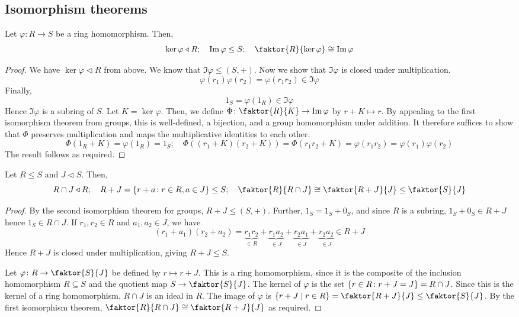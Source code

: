 \subsection{Isomorphism theorems}
\begin{theorem}
	Let \( \varphi \colon R \to S \) be a ring homomorphism.
	Then,
	\[
		\ker \varphi \triangleleft R;\quad \Im \varphi \leq S;\quad \faktor{R}{\ker \varphi} \cong \Im \varphi
	\]
\end{theorem}
\begin{proof}
	We have \( \ker \varphi \triangleleft R \) from above.
	We know that \( \Im \varphi \leq (S, +) \).
	Now we show that \( \Im \varphi \) is closed under multiplication.
	\[
		\varphi(r_1) \varphi(r_2) = \varphi(r_1 r_2) \in \Im \varphi
	\]
	Finally,
	\[
		1_S = \varphi(1_R) \in \Im \varphi
	\]
	Hence \( \Im \varphi \) is a subring of \( S \).
	Let \( K = \ker \varphi \).
	Then, we define \( \Phi \colon \faktor{R}{K} \to \Im \varphi \) by \( r+K \mapsto r \).
	By appealing to the first isomorphism theorem from groups, this is well-defined, a bijection, and a group homomorphism under addition.
	It therefore suffices to show that \( \Phi \) preserves multiplication and maps the multiplicative identities to each other.
	\[
		\Phi(1_R + K) = \varphi(1_R) = 1_S;\quad \Phi((r_1+K)(r_2+K)) = \Phi(r_1 r_2 +K) = \varphi(r_1 r_2) = \varphi(r_1) \varphi(r_2)
	\]
	The result follows as required.
\end{proof}
\begin{theorem}
	Let \( R \leq S \) and \( J \triangleleft S \).
	Then,
	\[
		R \cap J \triangleleft R;\quad R + J = \qty{r+a \colon r\in R, a \in J} \leq S;\quad \faktor{R}{R \cap J} \cong \faktor{R+J}{J} \leq \faktor{S}{J}
	\]
\end{theorem}
\begin{proof}
	By the second isomorphism theorem for groups, \( R+J \leq (S, +) \).
	Further, \( 1_S = 1_S + 0_S \), and since \( R \) is a subring, \( 1_S + 0_S \in R + J \) hence \( 1_S \in R \cap J \).
	If \( r_1, r_2 \in R \) and \( a_1, a_2 \in J \), we have
	\[
		(r_1 + a_1)(r_2 + a_2) = \underbrace{r_1 r_2}_{\in R} + \underbrace{r_1 a_2}_{\in J} + \underbrace{r_2 a_1}_{\in J} + \underbrace{r_2 a_2}_{\in J} \in R + J
	\]
	Hence \( R+J \) is closed under multiplication, giving \( R+J \leq S \).

	Let \( \varphi \colon R \to \faktor{S}{J} \) be defined by \( r \mapsto r + J \).
	This is a ring homomorphism, since it is the composite of the inclusion homomorphism \( R \subseteq S \) and the quotient map \( S \to \faktor{S}{J} \).
	The kernel of \( \varphi \) is the set \( \qty{r \in R \colon r+J = J} = R \cap J \).
	Since this is the kernel of a ring homomorphism, \( R \cap J \) is an ideal in \( R \).
	The image of \( \varphi \) is \( \qty{r+J \mid r \in R} = \faktor{R+J}{J} \leq \faktor{S}{J} \).
	By the first isomorphism theorem, \( \faktor{R}{R \cap J} \cong \faktor{R+J}{J} \) as required.
\end{proof}
